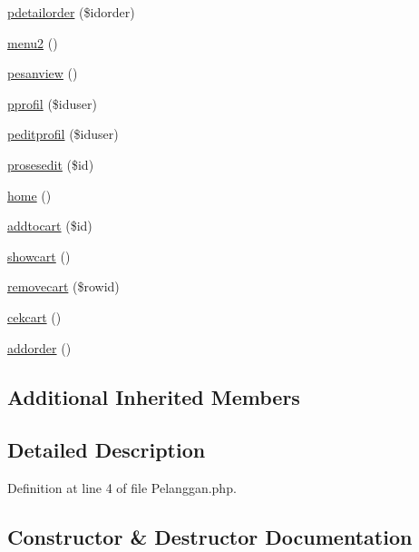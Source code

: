 \begin{DoxyCompactItemize}
\mbox{\hyperlink{class_pelanggan_ac0d0060fbc0a51ad837bfe7469e0f054}{pdetailorder}} (\$idorder)
\item 
\mbox{\hyperlink{class_pelanggan_ad2c26cff98a5f9db6b4dec1edc8ada7b}{menu2}} ()
\item 
\mbox{\hyperlink{class_pelanggan_a2184e0cd904ece2a3390ff342aedfeef}{pesanview}} ()
\item 
\mbox{\hyperlink{class_pelanggan_a656de37894005c0bcc616041b8e57648}{pprofil}} (\$iduser)
\item 
\mbox{\hyperlink{class_pelanggan_a321df46e6899c5ecef512bee948efa2f}{peditprofil}} (\$iduser)
\item 
\mbox{\hyperlink{class_pelanggan_a580c41d234a611e73e56a65f5c5f3e48}{prosesedit}} (\$id)
\item 
\mbox{\hyperlink{class_pelanggan_a174b8e4c7d4d7363c6f773671defdeff}{home}} ()
\item 
\mbox{\hyperlink{class_pelanggan_ae739aac7ade34944585151952e9c523a}{addtocart}} (\$id)
\item 
\mbox{\hyperlink{class_pelanggan_a31e5e82d730a882fc93614c8e0878d2b}{showcart}} ()
\item 
\mbox{\hyperlink{class_pelanggan_a1b9dd472c16e5d04be01be8032bd7ffa}{removecart}} (\$rowid)
\item 
\mbox{\hyperlink{class_pelanggan_a4fe1079bf267b3b43db2d67e1c437e25}{cekcart}} ()
\item 
\mbox{\hyperlink{class_pelanggan_a375fb206d13bec0bc37f55b825bcbebf}{addorder}} ()
\end{DoxyCompactItemize}
\subsection*{Additional Inherited Members}


\subsection{Detailed Description}


Definition at line 4 of file Pelanggan.\+php.



\subsection{Constructor \& Destructor Documentation}
\mbox{\label{class_pelanggan_a095c5d389db211932136b53f25f39685}} 
